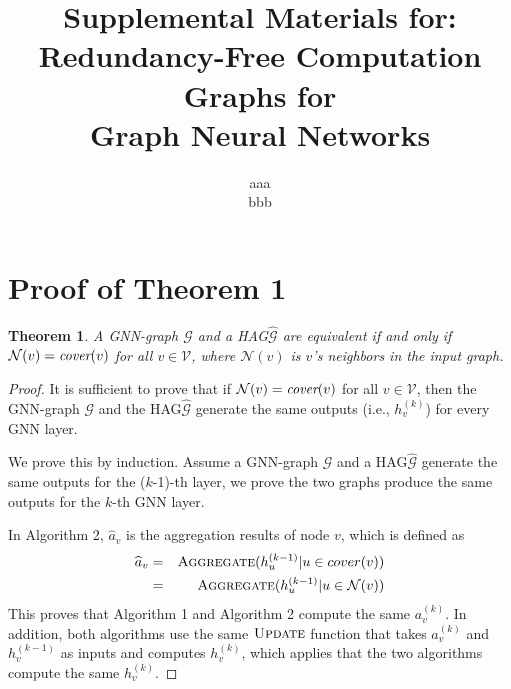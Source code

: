 \documentclass{article}
\title{Supplemental Materials for: \\ Redundancy-Free Computation Graphs for \\ Graph Neural Networks}
\author{%
aaa\\
bbb
}
\newcommand{\er}[1]{\mbox{\rm\em #1}}
\newcommand{\xg}{HAG\xspace}
\newcommand{\mw}[1] {\mathcal{\widehat{#1}}}
\newcommand{\m}[1] {\mathcal{#1}}
\newtheorem{theorem}{Theorem}
\begin{document}
\maketitle
\appendix

\section{Proof of Theorem 1}
\begin{theorem}
\label{thm2}
A GNN-graph $\m{G}$ and a \xg $\mw{G}$ are equivalent if and only if $\mathcal{N}(v) = \er{cover}(v)$ for all $v \in \m{V}$, where $\mathcal{N}(v)$ is $v$'s neighbors in the input graph.
\end{theorem}
\begin{proof}
It is sufficient to prove that if $\mathcal{N}(v) = \er{cover}(v)$ for all $v \in \m{V}$, then the GNN-graph $\m{G}$ and the \xg $\mw{G}$ generate the same outputs (i.e., $h_v^{(k)}$) for every GNN layer. 

We prove this by induction. Assume a GNN-graph $\m{G}$ and a \xg $\mw{G}$ generate the same outputs for the ($k$-1)-th layer, we prove the two graphs produce the same outputs for the $k$-th GNN layer.

In Algorithm 2, $\widehat{a}_v$ is the aggregation results of node $v$, which is defined as
\begin{eqnarray*}
\widehat{a}_v & = & \textproc{Aggregate}(h_u^{(k-1)} | u \in cover(v)) \\
& = & \textproc{Aggregate}(h_u^{(k-1)} | u \in \m{N}(v))
\end{eqnarray*}
This proves that Algorithm 1 and Algorithm 2 compute the same $a^{(k)}_v$. 
In addition, both algorithms use the same $\textproc{Update}$ function that takes $a^{(k)}_v$ and $h^{(k-1)}_v$ as inputs and computes $h^{(k)}_v$, which applies that the two algorithms compute the same $h^{(k)}_v$.
\end{proof}
\end{document}
